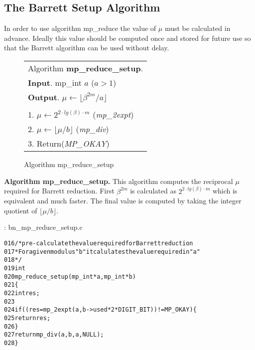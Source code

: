 \documentclass[b5paper]{book}
\begin{document}
\subsection{The Barrett Setup Algorithm}
In order to use algorithm mp\_reduce the value of $\mu$ must be calculated in advance.  Ideally this value should be computed once and stored for
future use so that the Barrett algorithm can be used without delay.  

\begin{figure}[!here]
\begin{small}
\begin{center}
\begin{tabular}{l}
\hline Algorithm \textbf{mp\_reduce\_setup}. \\
\textbf{Input}.   mp\_int $a$ ($a > 1$)  \\
\textbf{Output}.  $\mu \leftarrow \lfloor \beta^{2m}/a \rfloor$ \\
\hline \\
1.  $\mu \leftarrow 2^{2 \cdot lg(\beta) \cdot  m}$ (\textit{mp\_2expt}) \\
2.  $\mu \leftarrow \lfloor \mu / b \rfloor$ (\textit{mp\_div}) \\
3.  Return(\textit{MP\_OKAY}) \\
\hline
\end{tabular}
\end{center}
\end{small}
\caption{Algorithm mp\_reduce\_setup}
\end{figure}

\textbf{Algorithm mp\_reduce\_setup.}
This algorithm computes the reciprocal $\mu$ required for Barrett reduction.  First $\beta^{2m}$ is calculated as $2^{2 \cdot lg(\beta) \cdot  m}$ which
is equivalent and much faster.  The final value is computed by taking the integer quotient of $\lfloor \mu / b \rfloor$.

\vspace{+3mm}\begin{small}
\hspace{-5.1mm}{\bf File}: bn\_mp\_reduce\_setup.c
\vspace{-3mm}
\begin{alltt}
016   /* pre-calculate the value required for Barrett reduction
017    * For a given modulus "b" it calulates the value required in "a"
018    */
019   int
020   mp_reduce_setup (mp_int * a, mp_int * b)
021   \{
022     int     res;
023     
024     if ((res = mp_2expt (a, b->used * 2 * DIGIT_BIT)) != MP_OKAY) \{
025       return res;
026     \}
027     return mp_div (a, b, a, NULL);
028   \}
\end{alltt}
\end{small}
\end{document}
